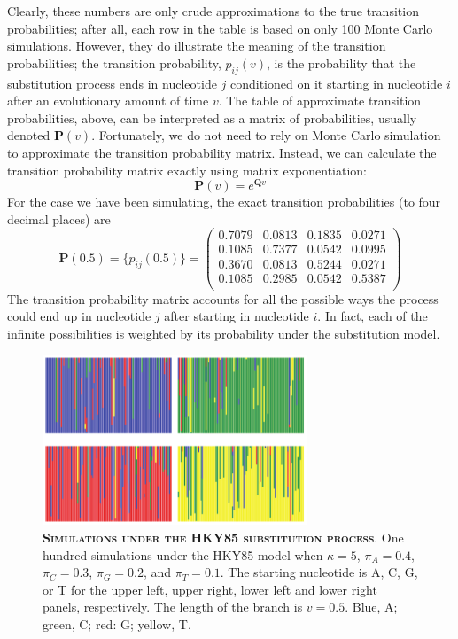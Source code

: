 \documentclass{svmult}
\begin{document}
Clearly, these numbers are only crude approximations to the true transition probabilities; after
all, each row in the table is based on only 100 Monte Carlo simulations. However, they do
illustrate the meaning of the transition probabilities; the transition probability, $p_{ij}(v)$, is
the probability that the substitution process ends in nucleotide $j$ conditioned on it starting in
nucleotide $i$ after an evolutionary amount of time $v$. The table of approximate transition
probabilities, above, can be interpreted as a matrix of probabilities, usually denoted ${\mathbf
P}(v)$.  Fortunately, we do not need to rely on Monte Carlo simulation to approximate the
transition probability matrix. Instead, we can calculate the transition probability matrix exactly
using matrix exponentiation:
$$
{\mathbf P}(v) = e^{{\mathbf Q} v}
$$
For the case we have been simulating, the exact transition probabilities (to four decimal places)
are
$$
{\mathbf P}(0.5) = \{p_{ij}(0.5)\} = \left( \begin{array}{rrrr}
0.7079 & 0.0813 & 0.1835 & 0.0271 \\
0.1085 & 0.7377 & 0.0542 & 0.0995 \\
0.3670 & 0.0813 & 0.5244 & 0.0271 \\
0.1085 & 0.2985 & 0.0542 & 0.5387 \\
\end{array} \right)
$$
The transition probability matrix accounts for all the possible ways the process could end up in
nucleotide $j$ after starting in nucleotide $i$. In fact, each of the infinite possibilities is
weighted by its probability under the substitution model.

\begin{figure}[t]
\centering
\includegraphics[height=2in]{fig4}
\caption{\textbf{\textsc{Simulations under the HKY85 substitution process}}.
One hundred simulations under the HKY85 model when $\kappa = 5$, $\pi_A = 0.4$, $\pi_C = 0.3$,
$\pi_G = 0.2$, and $\pi_T = 0.1$. The starting nucleotide is A, C, G, or T for the upper left,
upper right, lower left and lower right panels, respectively. The length of the branch is $v =
0.5$. Blue, A; green, C; red: G; yellow, T. 
}
\label{fig4}
\end{figure}
\end{document}
